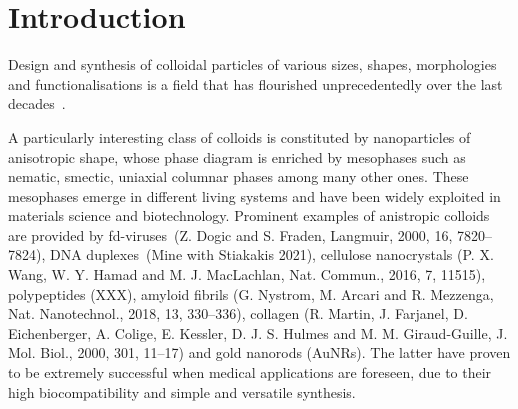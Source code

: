 \documentclass[journal=jacsat,manuscript=article]{achemso}
\begin{document}
\section{Introduction}



Design and synthesis of colloidal particles of various sizes, shapes, morphologies and functionalisations is a field that has flourished unprecedentedly over the last decades~\cite{Hueckel2021,Sacanna2013,Manoharan2015,Glotzer2007}. 


A particularly interesting class of colloids is constituted by nanoparticles of anisotropic shape, whose 
phase diagram is enriched by mesophases such as nematic, smectic, uniaxial columnar phases among many other ones.
These mesophases emerge in different living systems and have been widely exploited in materials science and 
biotechnology.  Prominent examples of anistropic colloids are provided by fd-viruses~(Z. Dogic and S. Fraden,
Langmuir, 2000, 16, 7820–7824), DNA duplexes~(Mine with Stiakakis 2021), cellulose nanocrystals (P. X. Wang, W. Y.
Hamad and M. J. MacLachlan, Nat. Commun., 2016, 7, 11515), polypeptides (XXX), amyloid fibrils (G. Nystrom, M. Arcari
 and R. Mezzenga, Nat. Nanotechnol., 2018, 13, 330–336), collagen (R. Martin, J. Farjanel, D. Eichenberger, A.
Colige, E. Kessler, D. J. S. Hulmes and M. M. Giraud-Guille, J. Mol. Biol., 2000, 301, 11–17) and gold nanorods 
(AuNRs). The latter have proven to be extremely successful when 
medical applications are foreseen, due to their high  biocompatibility and simple 
and versatile synthesis. 
\end{document}
